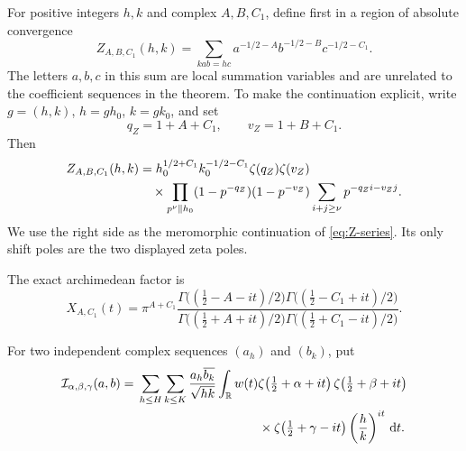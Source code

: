 For positive integers $h,k$ and complex $A,B,C_1$, define first in a region
of absolute convergence
\begin{equation}\label{eq:Z-series}
 Z_{A,B,C_1}(h,k)
 =\sum_{kab=hc}a^{-1/2-A}b^{-1/2-B}c^{-1/2-C_1}.
\end{equation}
The letters $a,b,c$ in this sum are local summation variables and are unrelated
to the coefficient sequences in the theorem.  To make the continuation
explicit, write $g=(h,k)$, $h=gh_0$, $k=gk_0$, and set
\[
                    q_Z=1+A+C_1,\qquad v_Z=1+B+C_1.
\]
Then
\begin{align}
 Z_{A,B,C_1}(h,k)
 &=h_0^{1/2+C_1}k_0^{-1/2-C_1}
   \zeta(q_Z)\zeta(v_Z) \notag\\
 &\quad\times
 \prod_{p^\nu\parallel h_0}
 (1-p^{-q_Z})(1-p^{-v_Z})
 \sum_{i+j\geq\nu}p^{-q_Zi-v_Zj}.
 \label{eq:Z-euler}
\end{align}
We use the right side as the meromorphic continuation of
\eqref{eq:Z-series}.  Its only shift poles are the two displayed zeta poles.

The exact archimedean factor is
\begin{equation}\label{eq:X-def}
 X_{A,C_1}(t)=\pi^{A+C_1}
 \frac{
 \Gamma\bigl((\frac12-A-it)/2\bigr)
 \Gamma\bigl((\frac12-C_1+it)/2\bigr)}{
 \Gamma\bigl((\frac12+A+it)/2\bigr)
 \Gamma\bigl((\frac12+C_1-it)/2\bigr)}.
\end{equation}

For two independent complex sequences $(a_h)$ and $(b_k)$, put
\begin{align}
 \I_{\alpha,\beta,\gamma}(a,b)
 ={}&\sum_{h\leq H}\sum_{k\leq K}
 \frac{a_h\overline{b_k}}{\sqrt{hk}}
 \int_{\R}w(t)
 \zeta\!\left(\tfrac12+\alpha+it\right)
 \zeta\!\left(\tfrac12+\beta+it\right) \notag\\
 &\hspace{34mm}\times
 \zeta\!\left(\tfrac12+\gamma-it\right)
 \left(\frac hk\right)^{it}\dd t.
 \label{eq:I-def}
\end{align}

